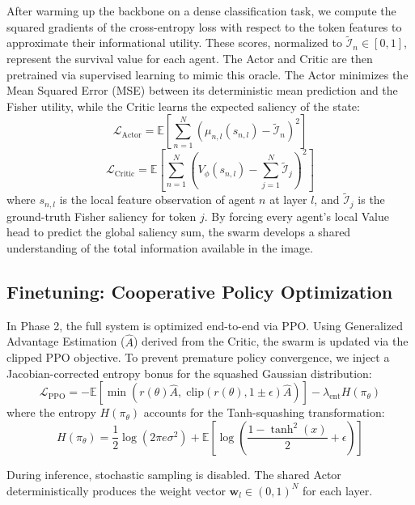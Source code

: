 After warming up the backbone on a dense classification task, we compute the squared gradients of the cross-entropy loss with respect to the token features to approximate their informational utility. These scores, normalized to $\tilde{\mathcal{I}}_n \in [0, 1]$, represent the survival value for each agent. The Actor and Critic are then pretrained via supervised learning to mimic this oracle. The Actor minimizes the Mean Squared Error (MSE) between its deterministic mean prediction and the Fisher utility, while the Critic learns the expected saliency of the state:
\begin{equation}
	\mathcal{L}_{\text{Actor}} = \mathbb{E} \left[ \sum_{n=1}^N \left( \mu_{n,l}(s_{n,l}) - \tilde{\mathcal{I}}_n \right)^2 \right]
\end{equation}
\begin{equation}
	\mathcal{L}_{\text{Critic}} = \mathbb{E} \left[ \sum_{n=1}^N \left( V_\phi(s_{n,l}) - \sum_{j=1}^N \tilde{\mathcal{I}}_j \right)^2 \right]
\end{equation}
where $s_{n,l}$ is the local feature observation of agent $n$ at layer $l$, and $\tilde{\mathcal{I}}_j$ is the ground-truth Fisher saliency for token $j$. By forcing every agent's local Value head to predict the global saliency sum, the swarm develops a shared understanding of the total information available in the image.

\subsection{Finetuning: Cooperative Policy Optimization}
In Phase 2, the full system is optimized end-to-end via PPO. Using Generalized Advantage Estimation ($\hat{A}$) derived from the Critic, the swarm is updated via the clipped PPO objective. To prevent premature policy convergence, we inject a Jacobian-corrected entropy bonus for the squashed Gaussian distribution:
\begin{equation}
	\mathcal{L}_{\mathrm{PPO}} = -\mathbb{E}\left[\min\left(r(\theta)\hat{A},\; \mathrm{clip}(r(\theta),1\pm\epsilon)\hat{A}\right)\right] - \lambda_{\mathrm{ent}} H(\pi_\theta)
\end{equation}
where the entropy $H(\pi_\theta)$ accounts for the Tanh-squashing transformation:
\begin{equation}
	H(\pi_\theta) = \frac{1}{2}\log(2\pi e\sigma^2) + \mathbb{E}\left[\log \left( \frac{1 - \tanh^2(x)}{2} + \epsilon \right) \right]
\end{equation}

During inference, stochastic sampling is disabled. The shared Actor deterministically produces the weight vector $\mathbf{w}_l \in (0,1)^N$ for each layer.
